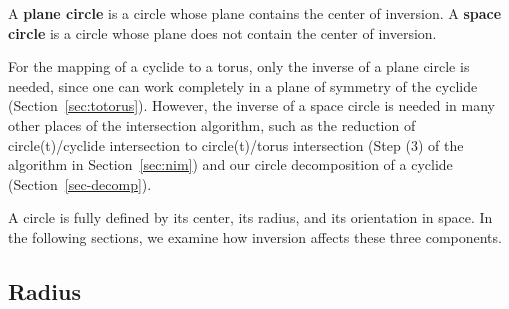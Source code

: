 \begin{defn2}
A {\bf plane circle} is a circle whose plane contains the center of inversion. 
A {\bf space circle} is a circle whose plane does not contain the center of
inversion.
\end{defn2}

For the mapping of a cyclide to a torus,
only the inverse of a plane circle is needed, since
one can work completely in a plane of symmetry of the cyclide 
(Section~\ref{sec:totorus}).
However, the inverse of a space circle is needed in many other places of the
intersection algorithm, such as the reduction of 
circle(t)/cyclide intersection to circle(t)/torus intersection
(Step (3) of the algorithm in Section~\ref{sec:nim})
and our circle decomposition of a cyclide (Section~\ref{sec-decomp}).

A circle is fully defined by its center, its radius, and its
orientation in space.
In the following sections, we examine how inversion affects these 
three components.

\subsection{Radius}

